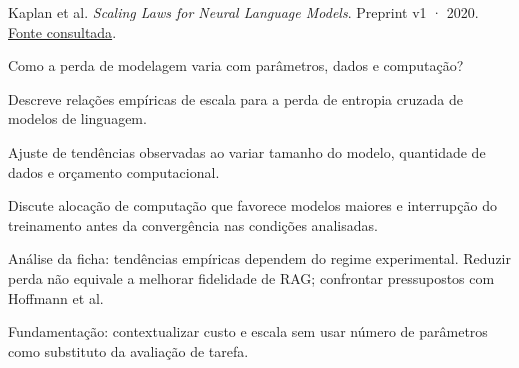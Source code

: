 {\small Kaplan et al. \textit{Scaling Laws for Neural Language Models}. Preprint v1 · 2020. \href{https://arxiv.org/pdf/2001.08361v1}{Fonte consultada}.\par}

Como a perda de modelagem varia com parâmetros, dados e computação?

Descreve relações empíricas de escala para a perda de entropia cruzada de modelos de linguagem.

Ajuste de tendências observadas ao variar tamanho do modelo, quantidade de dados e orçamento computacional.

Discute alocação de computação que favorece modelos maiores e interrupção do treinamento antes da convergência nas condições analisadas.

\begin{itemize}
\end{itemize}

Análise da ficha: tendências empíricas dependem do regime experimental. Reduzir perda não equivale a melhorar fidelidade de RAG; confrontar pressupostos com Hoffmann et al.

Fundamentação: contextualizar custo e escala sem usar número de parâmetros como substituto da avaliação de tarefa.


